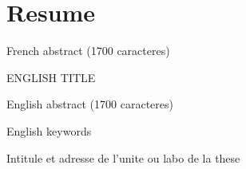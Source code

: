 \chapter*{Resume}

French abstract (1700 caracteres)

ENGLISH TITLE 

English abstract (1700 caracteres)

English keywords

Intitule et adresse de l'unite ou labo de la these